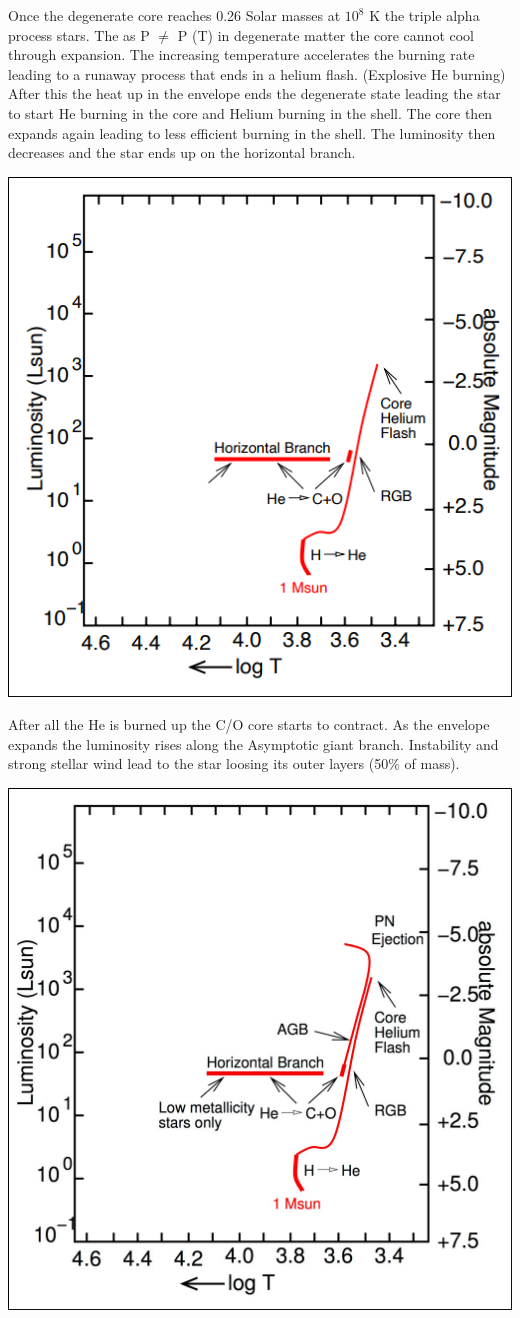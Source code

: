 \documentclass[11pt,a4paper]{article}
\begin{document}
Once the degenerate core reaches 0.26 Solar masses at $10^8$ K the triple alpha process stars. 
The as P $\neq$ P (T) in degenerate matter the core cannot cool through expansion. 
The increasing temperature accelerates the burning rate leading to a runaway process that ends in a helium flash. (Explosive He burning)
After this the heat up in the envelope ends the degenerate state leading the star to start He burning in the core and Helium burning in the shell. 
The core then expands again leading to less efficient burning in the shell. 
The luminosity then decreases and the star ends up on the horizontal branch. 
\begin{center}
    \includegraphics[width=0.5\linewidth]{screenshot_2024-01-23-125357.png}
\end{center}
After all the He is burned up the C/O core starts to contract. 
As the envelope expands the luminosity rises along the Asymptotic giant branch. 
Instability and strong stellar wind lead to the star loosing its outer layers (50\% of mass). 
\begin{center}
    \includegraphics[width=0.5\linewidth]{screenshot_2024-01-23-125721.png}
\end{center}
\end{document}
